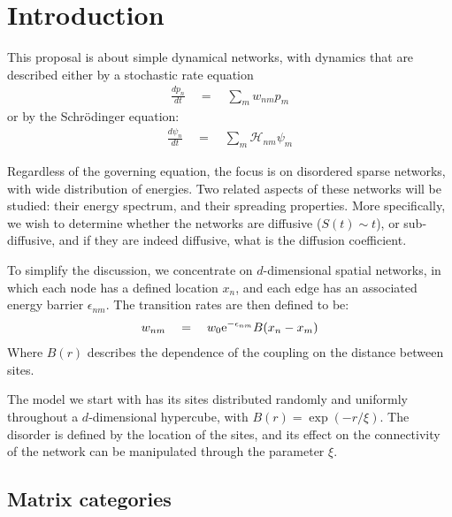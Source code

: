 \chapter{Introduction}


This proposal is about simple dynamical networks, with dynamics
that are described either by a stochastic rate equation
%
\begin{align}
  \frac{dp_n}{dt} \quad = \quad \sum_m w_{nm}p_m
\end{align}
%
or by the Schr\"{o}dinger equation:
%
\begin{align}
  \frac{d\psi_n}{dt} \quad = \quad \sum_m \mathcal{H}_{nm}\psi_m
\end{align}
%

Regardless of the governing equation, the focus is
on disordered sparse networks, with wide distribution of energies. 
Two related aspects of these networks will be studied: their energy spectrum,
and their spreading properties. More specifically, we wish to determine
whether the networks are diffusive ($S(t)\sim t$), or sub-diffusive, and
if they are indeed diffusive, what is the diffusion coefficient. 




To simplify the discussion, we concentrate on $d$-dimensional spatial networks,
in which each node has a defined location $x_n$, and each edge has an associated 
energy barrier $\epsilon_{nm}$. The transition rates are then defined to be:
%
\begin{align}
w_{nm} \quad = \quad w_0 \mbox{e}^{-\epsilon_{nm}}B(x_n-x_m)
\end{align}
%
Where $B(r)$ describes the dependence of the coupling on the
distance between sites.


The model we start with has its sites distributed randomly and uniformly throughout
a $d$-dimensional hypercube, with $B(r) = \exp(-r/\xi)$. The disorder is defined by the location
of the sites, and its effect on the connectivity of the network can be manipulated through the 
parameter $\xi$. 



\section{Matrix categories}\label{sec:matrix_categories}


